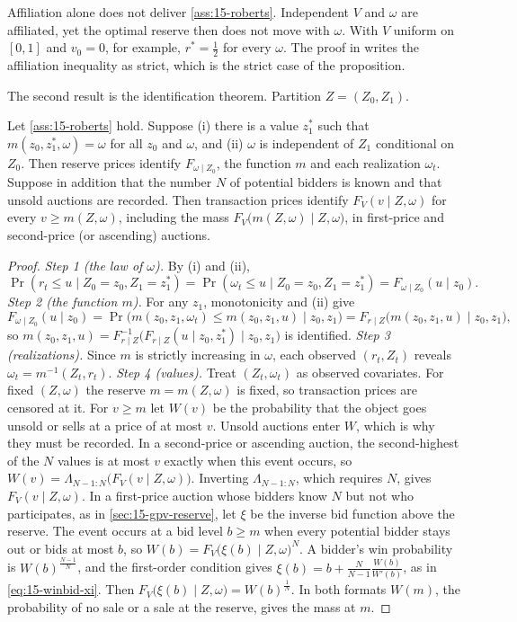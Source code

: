 Affiliation alone does not deliver \cref{ass:15-roberts}. Independent $V$ and $\omega$ are affiliated, yet the
optimal reserve then does not move with $\omega$. With $V$ uniform on $[0,1]$ and $v_0=0$, for example,
$r^*=\frac12$ for every $\omega$. The proof in \citet[Appendix~B]{Roberts2013} writes the affiliation inequality
as strict, which is the strict case of the proposition.

The second result is the identification theorem. Partition $Z=(Z_0,Z_1)$.

\begin{proposition}\label{prop:15-roberts2}
Let \cref{ass:15-roberts} hold. Suppose (i) there is a value $z_1^*$ such that $m(z_0,z_1^*,\omega)=\omega$
for all $z_0$ and $\omega$, and (ii) $\omega$ is independent of $Z_1$ conditional on $Z_0$. Then reserve prices
identify $F_{\omega\mid Z_0}$, the function $m$ and each realization $\omega_t$. Suppose in addition that the
number $N$ of potential bidders is known and that unsold auctions are recorded. Then transaction prices identify
$F_V(v\mid Z,\omega)$ for every $v\ge m(Z,\omega)$, including the mass $F_V\big(m(Z,\omega)\mid Z,\omega\big)$, in
first-price and second-price (or ascending) auctions.
\end{proposition}

\begin{proof}
\emph{Step 1 (the law of $\omega$).} By (i) and (ii),
\[
\Pr(r_t\le u\mid Z_0=z_0,Z_1=z_1^*)=\Pr(\omega_t\le u\mid Z_0=z_0,Z_1=z_1^*)=F_{\omega\mid Z_0}(u\mid z_0).
\]
\emph{Step 2 (the function $m$).} For any $z_1$, monotonicity and (ii) give
\[
F_{\omega\mid Z_0}(u\mid z_0)=\Pr\big(m(z_0,z_1,\omega_t)\le m(z_0,z_1,u)\mid z_0,z_1\big)=F_{r\mid Z}\big(m(z_0,z_1,u)\mid z_0,z_1\big),
\]
so $m(z_0,z_1,u)=F_{r\mid Z}^{-1}\big(F_{r\mid Z}(u\mid z_0,z_1^*)\mid z_0,z_1\big)$ is identified.
\emph{Step 3 (realizations).} Since $m$ is strictly increasing in $\omega$, each observed $(r_t,Z_t)$
reveals $\omega_t=m^{-1}(Z_t,r_t)$.
\emph{Step 4 (values).} Treat $(Z_t,\omega_t)$ as observed covariates. For fixed $(Z,\omega)$ the
reserve $m=m(Z,\omega)$ is fixed, so transaction prices are censored at it. For $v\ge m$ let $W(v)$ be the
probability that the object goes unsold or sells at a price of at most $v$. Unsold auctions enter $W$, which
is why they must be recorded. In a second-price or ascending auction, the second-highest of the $N$ values is
at most $v$ exactly when this event occurs, so $W(v)=\Lambda_{N-1:N}\big(F_V(v\mid Z,\omega)\big)$. Inverting
$\Lambda_{N-1:N}$, which requires $N$, gives $F_V(v\mid Z,\omega)$. In a first-price auction whose bidders know $N$
but not who participates, as in \cref{sec:15-gpv-reserve}, let $\xi$ be the inverse bid function above the
reserve. The event occurs at a bid level $b\ge m$ when every potential bidder
stays out or bids at most $b$, so $W(b)=F_V\big(\xi(b)\mid Z,\omega\big)^N$. A bidder's win probability is
$W(b)^{\frac{N-1}{N}}$, and the first-order condition gives $\xi(b)=b+\frac{N}{N-1}\frac{W(b)}{W'(b)}$, as in
\eqref{eq:15-winbid-xi}. Then $F_V\big(\xi(b)\mid Z,\omega\big)=W(b)^{\frac1N}$. In both formats $W(m)$, the
probability of no sale or a sale at the reserve, gives the mass at $m$.
\end{proof}

